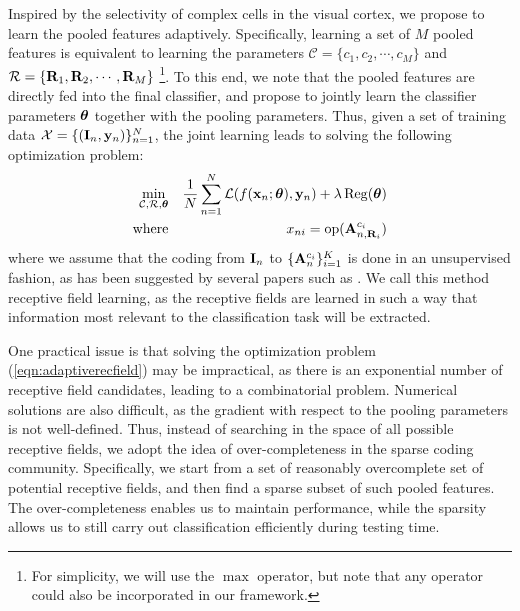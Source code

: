 Inspired by the selectivity of complex cells in the visual cortex, we propose to learn the pooled features adaptively. Specifically, learning a set of $M$ pooled features is equivalent to learning the parameters $\mathcal{C} = \{c_1,c_2,\cdots,c_M\}$ and $\mathcal{R} = \{\mathbf{R}_1,\mathbf{R}_2,\cdots,\mathbf{R}_M\}$ \footnote{For simplicity, we will use the $\max$ operator, but note that any operator could also be incorporated in our framework.}. To this end, we note that the pooled features are directly fed into the final classifier, and propose to jointly learn the classifier parameters $\boldsymbol{\theta}$ together with the pooling parameters. Thus, given a set of training data $\mathcal{X} = \{(\mathbf{I}_n,\mathbf{y}_n)\}_{n=1}^{N}$, the joint learning leads to solving the following optimization problem:
\begin{eqnarray}\label{eqn:adaptiverecfield}
  \min_{\mathcal{C},\mathcal{R},\boldsymbol{\theta}} & & \frac{1}{N}\sum_{n=1}^{N}\mathcal{L}(f(\mathbf{x}_n;\boldsymbol{\theta}),\mathbf{y}_n) + \lambda\operatorname{Reg}(\boldsymbol{\theta})\\
  \text{where} & & x_{ni} = \operatorname{op} (\mathbf{A}^{c_i}_{n,\mathbf{R}_{i}})\nonumber
\end{eqnarray}
where we assume that the coding from $\mathbf{I}_{n}$ to $\{\mathbf{A}^{c_i}_{n}\}_{i=1}^{K}$ is done in an unsupervised fashion, as has been suggested by several papers such as \cite{Coates:wo}. We call this method receptive field learning, as the receptive fields are learned in such a way that information most relevant to the classification task will be extracted.

One practical issue is that solving the optimization problem (\ref{eqn:adaptiverecfield}) may be impractical, as there is an exponential number of receptive field candidates, leading to a combinatorial problem. Numerical solutions are also difficult, as the gradient with respect to the pooling parameters is not well-defined. Thus, instead of searching in the space of all possible receptive fields, we adopt the idea of over-completeness in the sparse coding community. Specifically, we start from a set of reasonably overcomplete set of potential receptive fields, and then find a sparse subset of such pooled features. The over-completeness enables us to maintain performance, while the sparsity allows us to still carry out classification efficiently during testing time.

